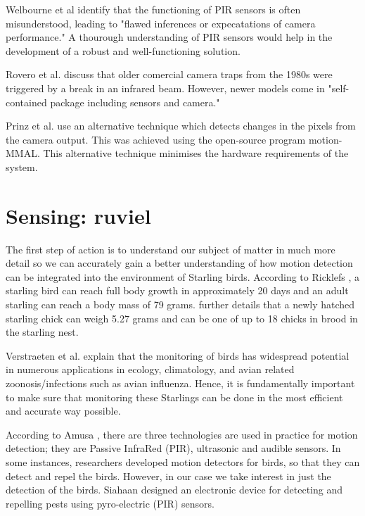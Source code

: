 \documentclass[class=report,11pt,crop=false]{standalone}
\begin{document}
Welbourne et al \cite{welbourne2016how} identify that the functioning of PIR sensors is often misunderstood, leading to "flawed inferences or expecatations of camera performance." A thourough understanding of PIR sensors would help in the development of a robust and well-functioning solution.

Rovero et al. \cite{rovero2013which} discuss that older comercial camera traps from the 1980s were triggered by a break in an infrared beam. However, newer models come in "self-contained package including sensors and camera." %

Prinz et al. \cite{prinz2016a} use an alternative technique which detects changes in the pixels from the camera output. This was achieved using the open-source program motion-MMAL. This alternative technique minimises the hardware requirements of the system.


\section{Sensing: ruviel}


The first step of action is to understand our subject of matter in much more detail so we can accurately gain a better understanding of how motion detection can be integrated into the environment of Starling birds. According to Ricklefs \cite{ricklefs1968patterns}, a starling bird can reach full body growth in approximately 20 days and an adult starling can reach a body mass of 79 grams. \cite{ricklefs1968patterns} further details that a newly hatched starling chick can weigh 5.27 grams and can be one of up to 18 chicks in brood in the starling nest. 

Verstraeten et al. \cite{verstraeten2010webcams} explain that the monitoring of birds has widespread potential in numerous applications in ecology, climatology, and avian related zoonosis/infections such as avian influenza. Hence, it is fundamentally important to make sure that monitoring these Starlings can be done in the most efficient and accurate way possible.

According to Amusa \cite{amusa2015pyro}, there are three technologies are used in practice for motion detection; they are Passive InfraRed (PIR), ultrasonic and audible sensors. In some instances, researchers developed motion detectors for birds, so that they can detect and repel the birds. However, in our case we take interest in just the detection of the birds. Siahaan \cite{siahaan2017design} designed an electronic device for detecting and repelling pests using pyro-electric (PIR) sensors.
\end{document}

